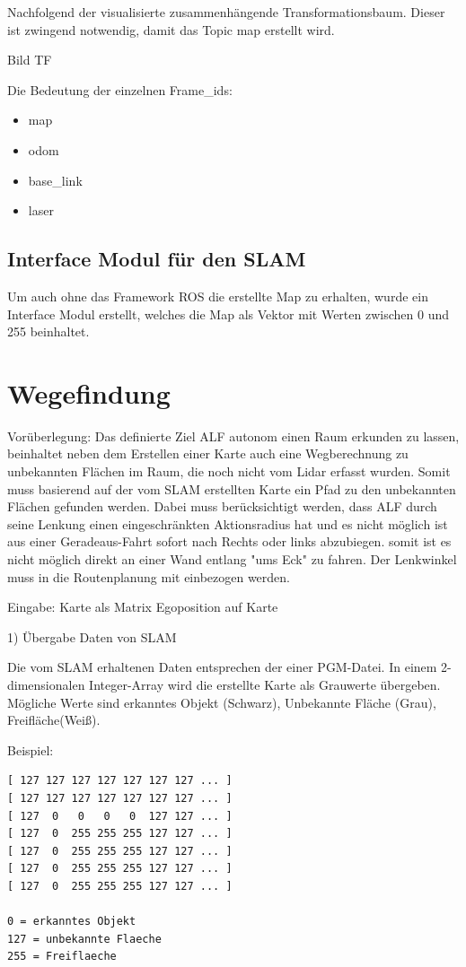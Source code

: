 Nachfolgend der visualisierte zusammenhängende Transformationsbaum. Dieser ist zwingend notwendig, damit das Topic map erstellt wird. 

Bild TF

Die Bedeutung der einzelnen Frame\_ids:

\begin{itemize}
\item map
\item odom
\item base\_link
\item laser
\end{itemize}


\subsection{Interface Modul für den SLAM}

Um auch ohne das Framework ROS die erstellte Map zu erhalten, wurde ein Interface Modul erstellt, welches die Map als Vektor mit Werten zwischen 0 und 255 beinhaltet. 



\section{Wegefindung}


Vorüberlegung:
Das definierte Ziel ALF autonom einen Raum erkunden zu lassen, beinhaltet neben dem Erstellen einer Karte auch eine Wegberechnung zu unbekannten Flächen im Raum, die noch nicht vom Lidar erfasst wurden. Somit muss basierend auf der vom SLAM erstellten Karte ein Pfad zu den unbekannten Flächen gefunden werden.
Dabei muss berücksichtigt werden, dass ALF durch seine Lenkung einen eingeschränkten Aktionsradius hat und es nicht möglich ist aus einer Geradeaus-Fahrt sofort nach Rechts oder links abzubiegen. somit ist es nicht möglich direkt an einer Wand entlang "ums Eck" zu fahren. Der Lenkwinkel muss in die Routenplanung mit einbezogen werden. 

Eingabe: 
Karte als Matrix
Egoposition auf Karte


1) Übergabe Daten von SLAM

Die vom SLAM erhaltenen Daten entsprechen der einer PGM-Datei. In einem 2-dimensionalen Integer-Array wird die erstellte Karte als Grauwerte übergeben. Mögliche Werte sind 
erkanntes Objekt (Schwarz),  Unbekannte Fläche (Grau),  Freifläche(Weiß).


Beispiel: 
\begin{lstlisting}
[ 127 127 127 127 127 127 127 ... ]
[ 127 127 127 127 127 127 127 ... ]
[ 127  0   0   0   0  127 127 ... ]
[ 127  0  255 255 255 127 127 ... ]
[ 127  0  255 255 255 127 127 ... ]
[ 127  0  255 255 255 127 127 ... ]
[ 127  0  255 255 255 127 127 ... ]

0 = erkanntes Objekt
127 = unbekannte Flaeche
255 = Freiflaeche

\end{lstlisting}

